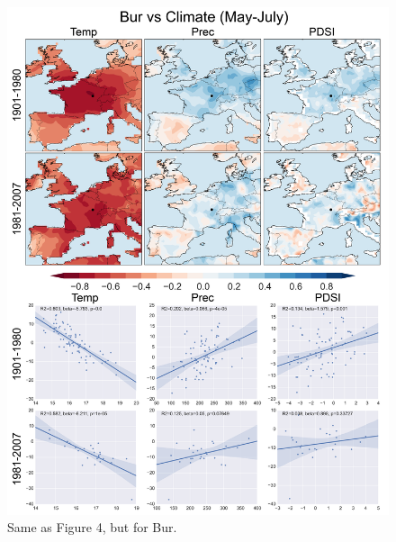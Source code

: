 \documentclass[12pt]{article}
\begin{document}
\begin{figure}
\center
\includegraphics[width=.9\columnwidth,scale=2]{SUPP_fig_06_Bur_MJJ_climate_onedeg_withtrend.png}
\caption{Same as Figure 4, but for Bur.}
\end{figure}
\end{document}
